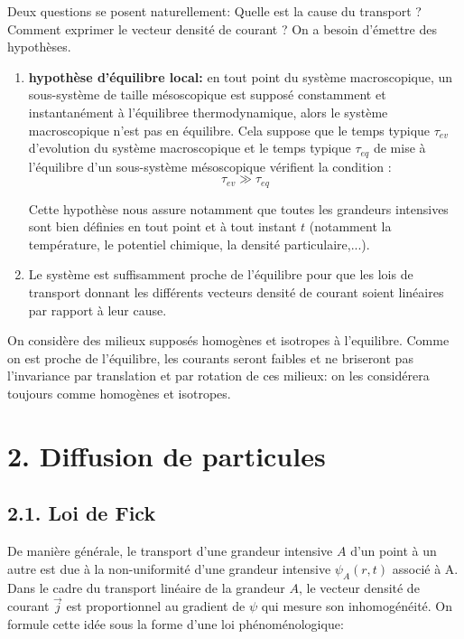 \documentclass[french, a4paper, 10pt, twocolumn, landscape]{article}
\begin{document}
Deux questions se posent naturellement: Quelle est la cause du transport ? Comment exprimer le vecteur densité de courant ? On a besoin d'émettre des hypothèses.

\begin{enumerate}
  \item \textbf{hypothèse d'équilibre local:} en tout point du système macroscopique, un sous-système de taille mésoscopique est supposé constamment et instantanément à l'équilibree thermodynamique, alors le système macroscopique n'est pas en équilibre. Cela suppose que le temps typique $\tau_{ev}$ d'evolution du  système macroscopique et le temps typique $\tau_{eq}$ de mise à l'équilibre d'un sous-système mésoscopique vérifient la condition :
 \begin{equation}
  \tau_{ev}\gg\tau_{eq}
 \end{equation} 

 Cette hypothèse nous assure notamment que toutes les grandeurs intensives sont bien définies en tout point et à tout instant $t$ (notamment la température, le potentiel chimique, la densité particulaire,...).
  \item Le système est suffisamment proche de l'équilibre pour que les lois de transport donnant les différents vecteurs densité de courant soient linéaires par rapport à leur cause.
\end{enumerate}
On considère des milieux supposés homogènes et isotropes à l'equilibre. Comme on est proche de l'équilibre, les courants seront faibles et ne briseront pas l'invariance par translation et par rotation de ces milieux: on les considérera toujours comme homogènes et isotropes.


\section*{2. Diffusion de particules}

\subsection*{2.1. Loi de Fick}

De manière générale, le transport d'une grandeur intensive $A$ d'un point à un autre est due à la non-uniformité d'une grandeur intensive $\psi_A(r,t)$ associé à A.  Dans le cadre du transport linéaire de la grandeur $A$, le vecteur densité de courant $\vec{j}$ est proportionnel au gradient de $\psi$ qui mesure son inhomogénéité. On formule cette idée sous la forme d'une loi phénoménologique: 
\end{document}
